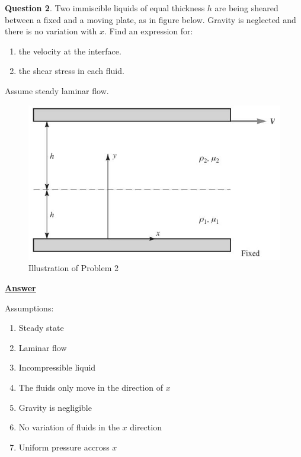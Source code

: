 \documentclass[10pt]{article}
\begin{document}
\break

\textbf{Question 2}. Two immiscible liquids of equal thickness $h$ are being sheared between a fixed and a moving plate, as in figure below. Gravity is neglected and there is no variation with $x$. Find an expression for:
\begin{enumerate}[label=\arabic*), noitemsep, nosep]
    \item the velocity at the interface.
    \item the shear stress in each fluid.
\end{enumerate}
Assume steady laminar flow.

\begin{figure}[h]
    \centering
    \includegraphics[scale=0.83]{Problem2.jpg}
    \caption{Illustration of Problem 2}
    \label{fig:figprob2}
\end{figure}

\textbf{\underline{Answer}}

Assumptions:
\begin{enumerate}
    \item Steady state
    \item Laminar flow
    \item Incompressible liquid
    \item The fluids only move in the direction of $x$
    \item Gravity is negligible
    \item No variation of fluids in the $x$ direction
    \item Uniform pressure accross $x$
\end{enumerate}

\hfill
\end{document}
